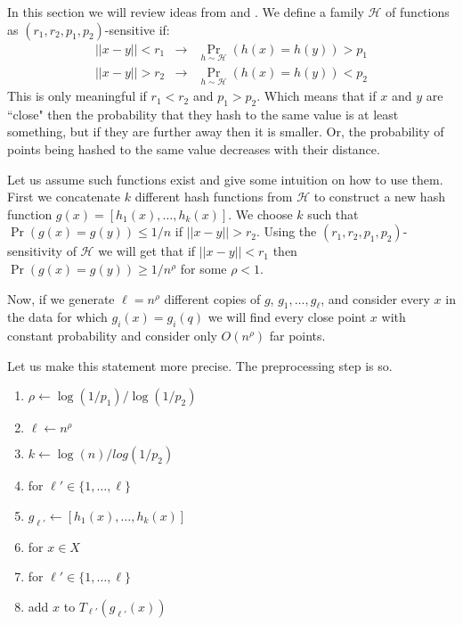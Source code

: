 

In this section we will review ideas from \cite{Charikar02} and \cite{GionisIM99}.
We define a family $\mathcal{H}$
of functions as $(r_1,r_2,p_1,p_2)$-sensitive if:
\begin{eqnarray*} 
|| x- y || < r_1 &\rightarrow& \Pr_{h \sim \mathcal{H}}(h(x)=h(y)) > p_1\\
|| x- y || > r_2 &\rightarrow& \Pr_{h \sim \mathcal{H}}(h(x)=h(y)) < p_2
\end{eqnarray*}
This is only meaningful if $r_1 < r_2$ and $p_1 > p_2$.
Which means that if $x$ and $y$ are ``close" then the probability that
they hash to the same value is at least something, but if they are further away
then it is smaller. Or, the probability of points being hashed to the same value 
decreases with their distance.


Let us assume such functions exist and give some intuition on how to use them.
First we concatenate $k$ different hash functions from $\mathcal{H}$ 
to construct a new hash function $g(x) = [h_1(x),\ldots,h_k(x)]$.
We choose $k$ such that $\Pr(g(x)=g(y)) \le 1/n$ if $||x-y|| > r_2$.
Using the $(r_1,r_2,p_1,p_2)$-sensitivity of $\mathcal{H}$ we will get that
if $||x-y|| < r_1$ then $\Pr(g(x)=g(y)) \ge 1/n^{\rho}$ for some $\rho<1$.

Now, if we generate $\ell = n^{\rho}$ different copies of $g$, $g_1,\ldots,g_\ell$,
and consider every $x$ in the data for which $g_i(x)=g_i(q)$ we will 
find every close point $x$ with constant probability and consider only $O(n^\rho)$ far points.

Let us make this statement more precise.
The preprocessing step is so.
\begin{enumerate}
\item $\rho \leftarrow \log(1/p_1)/\log(1/p_2)$
\item $\ell \leftarrow n^{\rho}$
\item $k \leftarrow \log(n)/log(1/p_2)$
\item for $\ell' \in \{1,\ldots,\ell\}$
\item \tab $g_{\ell'} \leftarrow [h_1(x),\ldots,h_k(x)]$
\item for $x \in X$
\item \tab for $\ell' \in \{1,\ldots,\ell\} $
\item \tab \tab add $x$ to $T_{\ell'}(g_{\ell'}(x))$
\end{enumerate}

